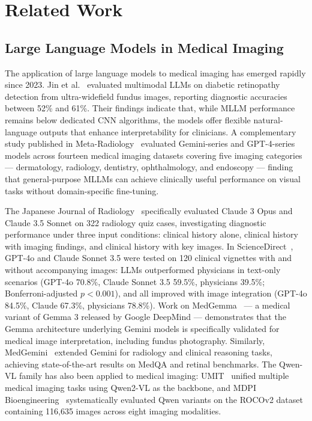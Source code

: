 \documentclass[11pt,a4paper]{article}
\begin{document}
\section{Related Work}

\subsection{Large Language Models in Medical Imaging}

The application of large language models to medical imaging has emerged rapidly since 2023. Jin et al.~\cite{jin2025mllm} evaluated multimodal LLMs on diabetic retinopathy detection from ultra-widefield fundus images, reporting diagnostic accuracies between 52\% and 61\%. Their findings indicate that, while MLLM performance remains below dedicated CNN algorithms, the models offer flexible natural-language outputs that enhance interpretability for clinicians. A complementary study published in Meta-Radiology~\cite{metaradiology2024} evaluated Gemini-series and GPT-4-series models across fourteen medical imaging datasets covering five imaging categories --- dermatology, radiology, dentistry, ophthalmology, and endoscopy --- finding that general-purpose MLLMs can achieve clinically useful performance on visual tasks without domain-specific fine-tuning.

The Japanese Journal of Radiology~\cite{claude2024jjr} specifically evaluated Claude 3 Opus and Claude 3.5 Sonnet on 322 radiology quiz cases, investigating diagnostic performance under three input conditions: clinical history alone, clinical history with imaging findings, and clinical history with key images. In ScienceDirect~\cite{sciencedirect2024}, GPT-4o and Claude Sonnet 3.5 were tested on 120 clinical vignettes with and without accompanying images: LLMs outperformed physicians in text-only scenarios (GPT-4o 70.8\%, Claude Sonnet 3.5 59.5\%, physicians 39.5\%; Bonferroni-adjusted $p < 0.001$), and all improved with image integration (GPT-4o 84.5\%, Claude 67.3\%, physicians 78.8\%). Work on MedGemma~\cite{medgemma2025} --- a medical variant of Gemma 3 released by Google DeepMind --- demonstrates that the Gemma architecture underlying Gemini models is specifically validated for medical image interpretation, including fundus photography. Similarly, MedGemini~\cite{saab2024gemini} extended Gemini for radiology and clinical reasoning tasks, achieving state-of-the-art results on MedQA and retinal benchmarks. The Qwen-VL family has also been applied to medical imaging: UMIT~\cite{umit2025} unified multiple medical imaging tasks using Qwen2-VL as the backbone, and MDPI Bioengineering~\cite{mdpi2025} systematically evaluated Qwen variants on the ROCOv2 dataset containing 116,635 images across eight imaging modalities.
\end{document}
